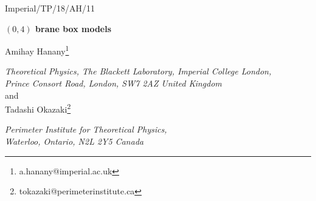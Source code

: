 \documentclass{article}
\numberwithin{equation}{section}
\begin{document}
\thispagestyle{empty}
\begin{flushright}
Imperial/TP/18/AH/11




\end{flushright}
\vskip2cm
\begin{center}
{\Large \bf $(0,4)$ brane box models
}



\vskip1.5cm
Amihay Hanany\footnote{a.hanany@imperial.ac.uk}

\bigskip
{\it 
Theoretical Physics, The Blackett Laboratory, Imperial College London,\\
Prince Consort Road, London, SW7 2AZ United Kingdom}
\\
\bigskip
and 
\\
\bigskip
Tadashi Okazaki\footnote{tokazaki@perimeterinstitute.ca}

\bigskip
{\it Perimeter Institute for Theoretical Physics,\\
Waterloo, Ontario, N2L 2Y5 Canada}



\end{center}












\vskip2cm
\begin{abstract}
Two-dimensional $\mathcal{N}=(0,4)$ supersymmetric quiver gauge theories 
are realized as D3-brane box configurations (two dimensional intervals) which are bounded by NS5-branes and intersect with D5-branes.
The periodic brane configuration is mapped to D1-D5-D5$'$ brane system at orbifold singularity via T-duality. 
The matter content and interactions are encoded by the $\mathcal{N}=(0,4)$ quiver diagrams 
which are determined by the brane configurations. 
The Abelian gauge anomaly cancellation indicates the presence of Fermi multiplets at the NS-NS$'$ junction. 
We also discuss the brane construction of 
$\mathcal{N}=(0,4)$ supersymmetric boundary conditions in 3d $\mathcal{N}=4$ gauge theories 
involving two-dimensional boundary degrees of freedom that cancel gauge anomaly. 
\end{abstract}





\newpage
\setcounter{tocdepth}{2}
\tableofcontents
\end{document}
